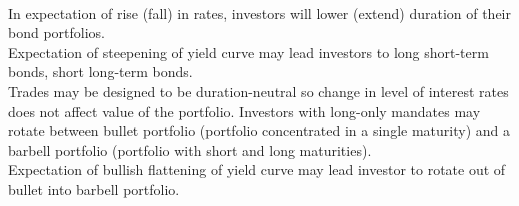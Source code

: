 \begin{remark} \\
In expectation of rise (fall) in rates, investors will lower (extend) duration of their bond portfolios.\\
Expectation of steepening of yield curve may lead investors to long short-term bonds, short long-term bonds.\\
Trades may be designed to be duration-neutral so change in level of interest rates does not affect value of the portfolio. Investors with long-only mandates may rotate between bullet portfolio (portfolio concentrated in a single maturity) and a barbell portfolio (portfolio with short and long maturities).\\
Expectation of bullish flattening of yield curve may lead investor to rotate out of bullet into barbell portfolio.
\end{remark}